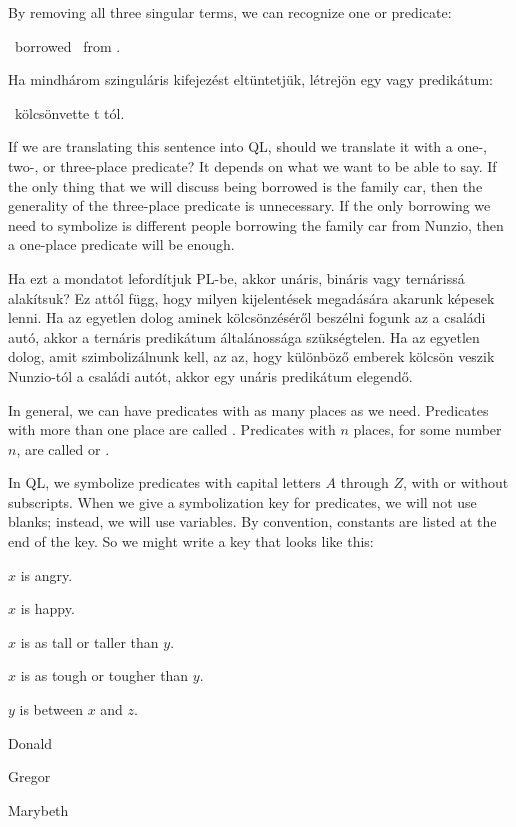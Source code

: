 By removing all three singular terms, we can recognize one  or  predicate:
\begin{center}
\blank\ borrowed \blank\ from \blank.
\end{center}

Ha mindhárom szinguláris kifejezést eltüntetjük, létrejön egy  vagy  predikátum:
\begin{center}
\blank\ kölcsönvette \blank\-t \blank\-tól.
\end{center}

If we are translating this sentence into QL, should we translate it with a one-, two-, or three-place predicate? It depends on what we want to be able to say. If the only thing that we will discuss being borrowed is the family car, then the generality of the three-place predicate is unnecessary. If the only borrowing we need to symbolize is different people borrowing the family car from Nunzio, then a one-place predicate will be enough.

Ha ezt a mondatot lefordítjuk PL-be, akkor unáris, bináris vagy ternárissá alakítsuk? Ez attól függ, hogy milyen kijelentések megadására akarunk képesek lenni. Ha az egyetlen dolog aminek kölcsönzéséről beszélni fogunk az a családi autó, akkor a ternáris predikátum általánossága szükségtelen. Ha az egyetlen dolog, amit szimbolizálnunk kell, az az, hogy különböző emberek kölcsön veszik Nunzio-tól a családi autót, akkor egy unáris predikátum elegendő.


In general, we can have predicates with as many places as we need. Predicates with more than one place are called . Predicates with $n$ places, for some number $n$, are called  or .

In QL, we symbolize predicates with capital letters $A$ through $Z$, with or without subscripts. When we give a symbolization key for predicates, we will not use blanks; instead, we will use variables. By convention, constants are listed at the end of the key. So we might write a key that looks like this:
\begin{ekey}
\item[Ax:] $x$ is angry.
\item[Hx:] $x$ is happy.
\item[T$_1$xy:] $x$ is as tall or taller than $y$.
\item[T$_2$xy:] $x$ is as tough or tougher than $y$.
\item[Bxyz:] $y$ is between $x$ and $z$.
\item[d:] Donald
\item[g:] Gregor
\item[m:] Marybeth
\end{ekey}

